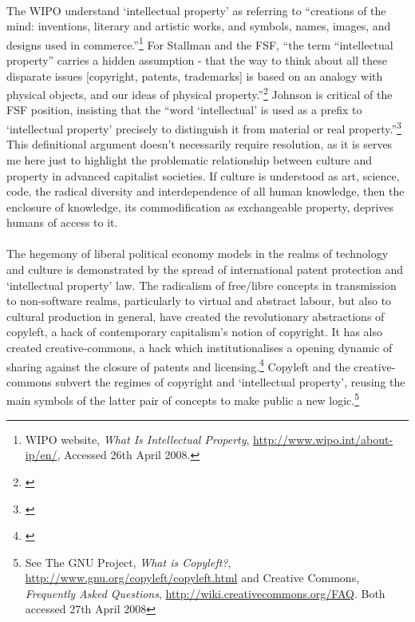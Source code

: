\paragraph{}The WIPO understand `intellectual property' as referring to ``creations of the mind: inventions, literary and artistic works, and symbols, names, images, and designs used in commerce.''\footnote{WIPO website, \textit{What Is Intellectual Property}, \url{http://www.wipo.int/about-ip/en/}, Accessed 26th April 2008.} For Stallman and the FSF, ``the term ``intellectual property'' carries a hidden assumption - that the way to think about all these disparate issues [copyright, patents, trademarks] is based on an analogy with physical objects, and our ideas of physical property.''\footnote{\cite{Stallman:2008wa}} Johnson is critical of the FSF position, insisting that the ``word `intellectual' is used as a prefix to `intellectual property' precisely to distinguish it from material or real property.''\footnote{\cite{Johnson:2004wa}} This definitional argument doesn't necessarily require resolution, as it is serves me here just to highlight the problematic relationship between culture and property in advanced capitalist societies. If culture is understood as art, science, code, the radical diversity and interdependence of all human knowledge, then the enclosure of knowledge, its commodification as exchangeable property, deprives humans of access to it.

\paragraph{}The hegemony of liberal political economy models in the realms of technology and culture is demonstrated by the spread of international patent protection and `intellectual property' law. The radicalism of free/libre concepts in transmission to non-software realms, particularly to virtual and abstract labour, but also to cultural production in general, have created the revolutionary abstractions of copyleft, a hack of contemporary capitalism's notion of copyright. It has also created creative-commons, a hack which institutionalises a opening dynamic of sharing against the closure of patents and licensing.\footnote{\cite[17m32sec]{moore:2002rv}} Copyleft and the creative-commons subvert the regimes of copyright and `intellectual property', reusing the main symbols of the latter pair of concepts to make public a new logic.\footnote{See The GNU Project, \textit{What is Copyleft?}, \url{http://www.gnu.org/copyleft/copyleft.html} and Creative Commons, \textit{Frequently Asked Questions}, \url{http://wiki.creativecommons.org/FAQ}. Both accessed 27th April 2008}

